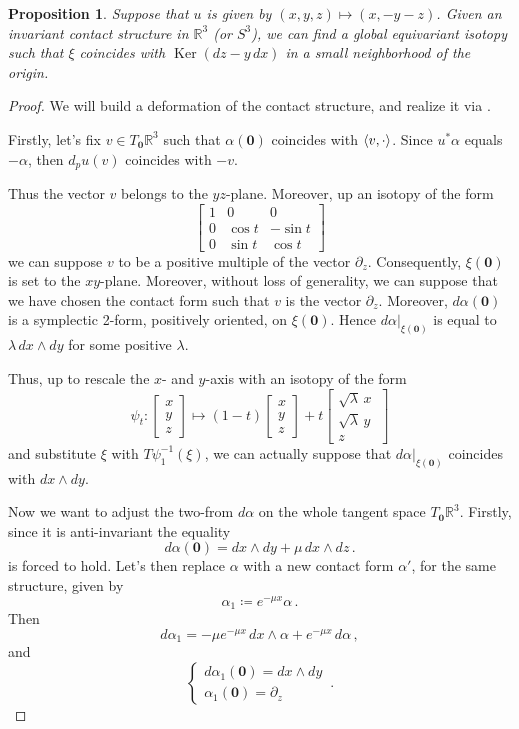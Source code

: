 \documentclass[a4paper, 11pt]{amsart}
\theoremstyle{plain}
\newtheorem{prop}{Proposition}[section]
\theoremstyle{definition}
\newcommand{\R}{\mathbb{R}}
\newcommand{\zero}{\mathbf{0}}
\DeclareMathOperator{\Ker}{Ker}
\DeclarePairedDelimiter{\ang}{\langle}{\rangle}
\begin{document}
\begin{prop}\label{EDarbouxustd}
	Suppose that $u$ is given by $(x,y,z) \mapsto (x,-y-z)$. Given an invariant contact structure in $\R^3$ (or $S^3$), we can find a global equivariant isotopy such that $\xi$ coincides with $\Ker(dz - y\,dx)$ in a small neighborhood of the origin.
\end{prop}
\begin{proof}
	We will build a deformation of the contact structure, and realize it via .
	
	Firstly, let's fix $v \in T_\zero\R^3$ such that $\alpha(\zero)$ coincides with $\ang{v,\cdot }$. Since $u^*\alpha$ equals $-\alpha$, then $d_pu(v)$ coincides with $-v$. 
	
	Thus the vector $v$ belongs to the $yz$-plane. Moreover, up an isotopy of the form
	\[
	\begin{bmatrix}
		1 & 0 & 0 \\
		0 & \cos t  & -\sin t\\
		0 & \sin t & \cos t
	\end{bmatrix}
	\]
	we can suppose $v$ to be a positive multiple of the vector $\partial_z$. Consequently, $\xi(\zero)$ is set to the $xy$-plane. Moreover, without loss of generality, we can suppose that we have chosen the contact form such that $v$ is the vector $\partial_z$. Moreover, $d\alpha(\zero)$ is a symplectic 2-form, positively oriented, on $\xi(\zero)$. Hence $d\alpha|_{\xi(\zero)}$ is equal to $\lambda\,dx \wedge dy$ for some positive $\lambda$.
	
	Thus, up to rescale the $x$- and $y$-axis with an isotopy of the form
	\[
	\psi_t \colon
	\begin{bmatrix}
		x \\
		y \\
		z
	\end{bmatrix}
	\mapsto (1-t)
	\begin{bmatrix}
		x\\[0.5ex]
		y\\[0.5ex]
		z
	\end{bmatrix}
	+ t
	\begin{bmatrix}
		\sqrt{\lambda}\,x\  \\[0.5ex]
		\sqrt{\lambda}\,y \\[0.5ex]
		z
	\end{bmatrix} 
	\]
	and substitute $\xi$ with $T\psi_1^{-1}(\xi)$, we can actually suppose that $d\alpha|_{\xi(\zero)}$ coincides with $dx \wedge dy$.
	
	Now we want to adjust the two-from $d\alpha$ on the whole tangent space $T_\zero\R^3$. Firstly, since it is anti-invariant the equality
	\[
	d\alpha(\zero) = dx\wedge dy + \mu\, dx \wedge dz\,.
	\]
	is forced to hold. Let's then replace $\alpha$ with a new contact form $\alpha'$, for the same structure, given by
	\[
	\alpha_1 \coloneqq e^{-\mu x}\alpha\,.
	\]
	Then 
	\[
	d\alpha_1 = -\mu e^{-\mu x}\,dx \wedge \alpha + e^{-\mu x}\,d\alpha\,,
	\]
	and
	\[
	\begin{cases}
		d\alpha_1(\zero) = dx \wedge dy\\
		\alpha_1(\zero) = \partial_z
	\end{cases}\,.
	\]
	

\end{proof}
\end{document}
